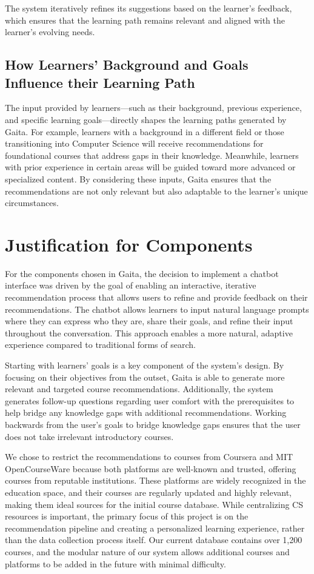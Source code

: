 The system iteratively refines its suggestions based on the learner's feedback, which ensures that the learning path remains relevant and aligned with the learner's evolving needs.

\subsection{How Learners' Background and Goals Influence their Learning Path}

The input provided by learners—such as their background, previous experience, and specific learning goals—directly shapes the learning paths generated by Gaita. For example, learners with a background in a different field or those transitioning into Computer Science will receive recommendations for foundational courses that address gaps in their knowledge. Meanwhile, learners with prior experience in certain areas will be guided toward more advanced or specialized content. By considering these inputs, Gaita ensures that the recommendations are not only relevant but also adaptable to the learner's unique circumstances.

\section{Justification for Components} 
For the components chosen in Gaita, the decision to implement a chatbot interface was driven by the goal of enabling an interactive, iterative recommendation process that allows users to refine and provide feedback on their recommendations. The chatbot allows learners to input natural language prompts where they can express who they are, share their goals, and refine their input throughout the conversation. This approach enables a more natural, adaptive experience compared to traditional forms of search. 

Starting with learners' goals is a key component of the system's design. By focusing on their objectives from the outset, Gaita is able to generate more relevant and targeted course recommendations. Additionally, the system generates follow-up questions regarding user comfort with the prerequisites to help bridge any knowledge gaps with additional recommendations. Working backwards from the user’s goals to bridge knowledge gaps ensures that the user does not take irrelevant introductory courses. 

We chose to restrict the recommendations to courses from Coursera and MIT OpenCourseWare because both platforms are well-known and trusted, offering courses from reputable institutions. These platforms are widely recognized in the education space, and their courses are regularly updated and highly relevant, making them ideal sources for the initial course database. While centralizing CS resources is important, the primary focus of this project is on the recommendation pipeline and creating a personalized learning experience, rather than the data collection process itself. Our current database contains over 1,200 courses, and the modular nature of our system allows additional courses and platforms to be added in the future with minimal difficulty. 

